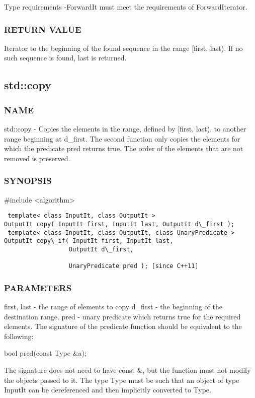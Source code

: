  Type requirements
 -ForwardIt must meet the requirements of ForwardIterator.

\subsubsection{RETURN VALUE}
Iterator to the beginning of the found sequence in the range [first, last). If no such sequence is found, last is returned.



\subsection{std::copy}

\subsubsection{NAME}
std::copy - Copies the elements in the range, defined by [first, last), to another range beginning at d\_first. The second function only copies the elements for which the predicate pred returns true. The order of the elements that are not removed is preserved.

\subsubsection{SYNOPSIS}
\#include <algorithm>

\begin{lstlisting}
 template< class InputIt, class OutputIt >
OutputIt copy( InputIt first, InputIt last, OutputIt d\_first );
 template< class InputIt, class OutputIt, class UnaryPredicate >
OutputIt copy\_if( InputIt first, InputIt last,
                  OutputIt d\_first,

                  UnaryPredicate pred ); [since C++11]
\end{lstlisting}

\subsubsection{PARAMETERS}
first, last - the range of elements to copy
d\_first - the beginning of the destination range.
pred - unary predicate which returns true  for the required elements.
The signature of the predicate function should be equivalent to the following:

 bool pred(const Type \&a);

The signature does not need to have const \&, but the function must not modify the objects passed to it.
The type Type must be such that an object of type InputIt can be dereferenced and then implicitly converted to Type.

